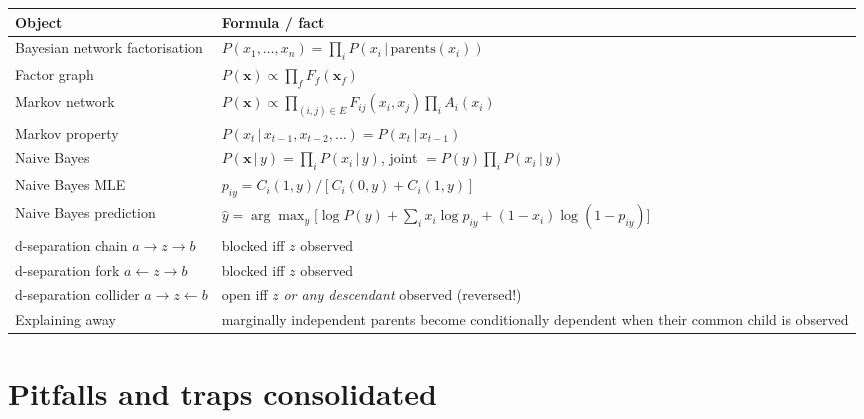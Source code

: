 \documentclass[11pt, a4paper]{article}
\newcommand{\thead}[1]{\textbf{#1}}
\begin{document}
\begin{tabularx}{\linewidth}{@{}lX@{}}
\toprule
\thead{Object} & \thead{Formula / fact} \\
\midrule
Bayesian network factorisation & $P(x_1, \ldots, x_n) = \prod_i P(x_i\,|\,\text{parents}(x_i))$ \\
Factor graph                   & $P(\mathbf{x}) \propto \prod_f F_f(\mathbf{x}_f)$ \\
Markov network                 & $P(\mathbf{x}) \propto \prod_{(i,j)\in E} F_{ij}(x_i, x_j)\prod_i A_i(x_i)$ \\
Markov property                & $P(x_t\,|\,x_{t-1}, x_{t-2}, \ldots) = P(x_t\,|\,x_{t-1})$ \\
Naive Bayes                    & $P(\mathbf{x}\,|\,y) = \prod_i P(x_i\,|\,y)$, joint $= P(y)\prod_i P(x_i\,|\,y)$ \\
Naive Bayes MLE                & $p_{iy} = C_i(1,y) / [C_i(0,y) + C_i(1,y)]$ \\
Naive Bayes prediction         & $\hat y = \arg\max_y\big[\log P(y) + \sum_i x_i\log p_{iy} + (1-x_i)\log(1-p_{iy})\big]$ \\
d-separation chain $a\to z\to b$ & blocked iff $z$ observed \\
d-separation fork $a\leftarrow z\to b$ & blocked iff $z$ observed \\
d-separation collider $a\to z\leftarrow b$ & open iff $z$ \emph{or any descendant} observed (reversed!) \\
Explaining away                & marginally independent parents become conditionally dependent when their common child is observed \\
\bottomrule
\end{tabularx}

\section*{Pitfalls and traps consolidated}
\end{document}
